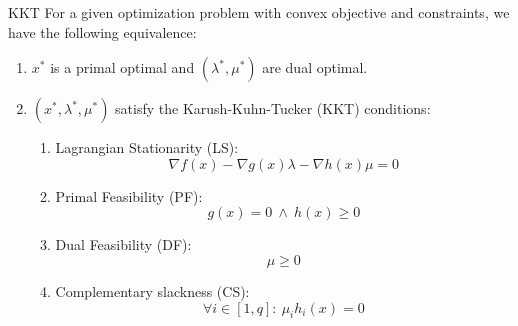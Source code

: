 
\begin{theo}[KKT]{KKT}
    For a given optimization problem with convex objective and constraints, we have the following equivalence:
    \begin{enumerate}
        \item $x^*$ is a primal optimal and $(\lambda^*, \mu^*)$ are dual optimal.
        \item 
            $(x^*, \lambda^*, \mu^*)$ satisfy the Karush-Kuhn-Tucker (KKT) conditions:
                \begin{enumerate}
                    \item Lagrangian Stationarity (LS):
                    $$
                    \nabla f(x) - \nabla g(x) \lambda - \nabla h(x) \mu = 0
                    $$
                    \item Primal Feasibility (PF):
                    $$
                    g(x) = 0 \ \land \ h(x) \geq 0
                    $$
                    \item Dual Feasibility (DF):
                    $$
                    \mu \geq 0
                    $$
                    \item Complementary slackness (CS):
                    $$
                    \forall i \in [1,q]: \ \mu_i h_i(x) = 0
                    $$
                \end{enumerate}
                \vspace{-0.3cm}
    \end{enumerate}
\end{theo}




